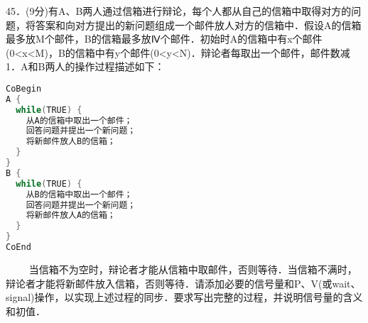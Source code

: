 45．(9分)有A、B两人通过信箱进行辩论，每个人都从自己的信箱中取得对方的问题，将答案和向对方提出的新问题组成一个邮件放人对方的信箱中．假设A的信箱最多放M个邮件，B的信箱最多放Ⅳ个邮件．初始时A的信箱中有x个邮件(0<x<M)，B的信箱中有y个邮件(0<y<N)．辩论者每取出一个邮件，邮件数减1．A和B两人的操作过程描述如下： \\
\begin{lstlisting}[language=cpp]
CoBegin
A {
  while(TRUE) {
    从A的信箱中取出一个邮件；
    回答问题并提出一个新问题；
    将新邮件放人B的信箱；
  }
}
B {
  while(TRUE) {
    从B的信箱中取出一个邮件；
    回答问题并提出一个新问题；
    将新邮件放人A的信箱；
  }
}
CoEnd
\end{lstlisting}
$\qquad$ 当信箱不为空时，辩论者才能从信箱中取邮件，否则等待．当信箱不满时，辩论者才能将新邮件放入信箱，否则等待．请添加必要的信号量和P、V(或wait、signal)操作，以实现上述过程的同步．要求写出完整的过程，并说明信号量的含义和初值．



